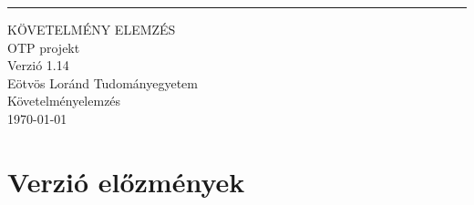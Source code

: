 \documentclass{scrreprt}
\date{}
\def\myversion{1.14}
\begin{document}
\begin{flushright}
      \rule{13cm}{3pt}\vskip1cm
      \begin{bfseries}
            \Huge{KÖVETELMÉNY ELEMZÉS}\\
            \vspace{1.8cm}
            OTP projekt\\
            \vspace{1.8cm}
            \LARGE{Verzió \myversion}\\
            \vspace{1.8cm}
            Eötvös Loránd Tudományegyetem\\ \small{Követelményelemzés}\\
            \vspace{1.8cm}
            \today\\
      \end{bfseries}
\end{flushright}

\renewcommand{\contentsname}{Tartalomjegyzék}
\tableofcontents

\chapter*{Verzió előzmények}
\end{document}
